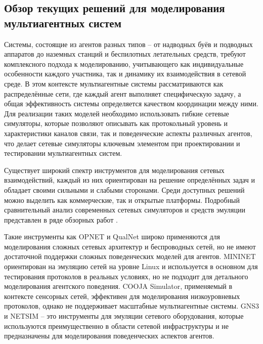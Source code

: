 \documentclass[
    numbers=section,
    document-code={ВКРБ--09.03.04--10.19--XX--26--81}
]{../latex/fqw}
\begin{document}
    \subsection{Обзор текущих решений для моделирования мультиагентных систем}
    \label{subsec:review_of_current_solutions_for_modeling_multi-agent_systems}
    \vspace{\baselineskip}

    Системы, состоящие из агентов разных типов --
    от надводных буёв и подводных аппаратов до наземных станций и беспилотных летательных средств,
    требуют комплексного подхода к моделированию, учитывающего как индивидуальные особенности каждого участника,
    так и динамику их взаимодействия в сетевой среде.
    В этом контексте мультиагентные системы рассматриваются как распределённые сети,
    где каждый агент выполняет специфическую задачу,
    а общая эффективность системы определяется качеством координации между ними.
    Для реализации таких моделей необходимо использовать гибкие сетевые симуляторы,
    которые позволяют описывать
    как протокольный уровень и характеристики каналов связи,
    так и поведенческие аспекты различных агентов,
    что делает сетевые симуляторы ключевым элементом при проектировании и тестировании мультиагентных систем.

    Существует широкий спектр инструментов для моделирования сетевых взаимодействий,
    каждый из них ориентирован на решение определённых задач и обладает своими сильными и слабыми сторонами.
    Среди доступных решений можно выделить как коммерческие, так и открытые платформы.
    Подробный сравнительный анализ современных сетевых симуляторов и средств
    эмуляции представлен в ряде обзорных работ\nbspace
    \cite{patelSurveyNetworkSimulators2018, gomezSurveyNetworkSimulators2023, panSurveyNetworkSimulation2008}.

    Такие инструменты как
    OPNET\nbspace\cite{OPNETNetworkSimulator}
    и
    QualNet\nbspace\cite{keysighttechnologiesQualNetNetworkSimulator}
    широко применяются для моделирования сложных сетевых архитектур и беспроводных сетей,
    но не имеют достаточной поддержки сложных поведенческих моделей для агентов.
    MININET\nbspace\cite{mininetprojectcontributorsMininetOverview} ориентирован на эмуляцию сетей на уровне Linux и
    используется в основном для тестирования протоколов в реальных условиях,
    но не подходит для детального моделирования агентского поведения.
    COOJA Simulator\nbspace\cite{contiki-ngprojectcontributorsRunningContikiNGCooja},
    применяемый в контексте сенсорных сетей,
    эффективен для моделирования низкоуровневых протоколов,
    однако не поддерживает масштабные мультиагентные системы.
    GNS3\nbspace\cite{gns3projectcontributorsGNS3Documentation}
    и
    NETSIM\nbspace\cite{tetcosllpNetSimNetworkSimulator}
    -- это инструменты для эмуляции сетевого оборудования,
    которые используются преимущественно в области сетевой инфраструктуры и
    не предназначены для моделирования поведенческих аспектов агентов.
\end{document}
